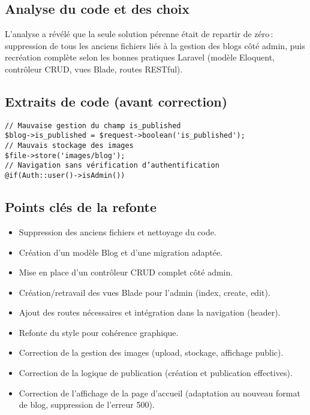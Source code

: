 \documentclass[a4paper,12pt]{report}
\begin{document}
\subsection{Analyse du code et des choix}
L’analyse a révélé que la seule solution pérenne était de repartir de zéro : suppression de tous les anciens fichiers liés à la gestion des blogs côté admin, puis recréation complète selon les bonnes pratiques Laravel (modèle Eloquent, contrôleur CRUD, vues Blade, routes RESTful).

\subsection{Extraits de code (avant correction)}
\begin{verbatim}
// Mauvaise gestion du champ is_published
$blog->is_published = $request->boolean('is_published');
// Mauvais stockage des images
$file->store('images/blog');
// Navigation sans vérification d’authentification
@if(Auth::user()->isAdmin())
\end{verbatim}

\subsection{Points clés de la refonte}
\begin{itemize}
    \item Suppression des anciens fichiers et nettoyage du code.
    \item Création d’un modèle Blog et d’une migration adaptée.
    \item Mise en place d’un contrôleur CRUD complet côté admin.
    \item Création/retravail des vues Blade pour l’admin (index, create, edit).
    \item Ajout des routes nécessaires et intégration dans la navigation (header).
    \item Refonte du style pour cohérence graphique.
    \item Correction de la gestion des images (upload, stockage, affichage public).
    \item Correction de la logique de publication (création et publication effectives).
    \item Correction de l’affichage de la page d’accueil (adaptation au nouveau format de blog, suppression de l’erreur 500).
\end{itemize}
\end{document}
